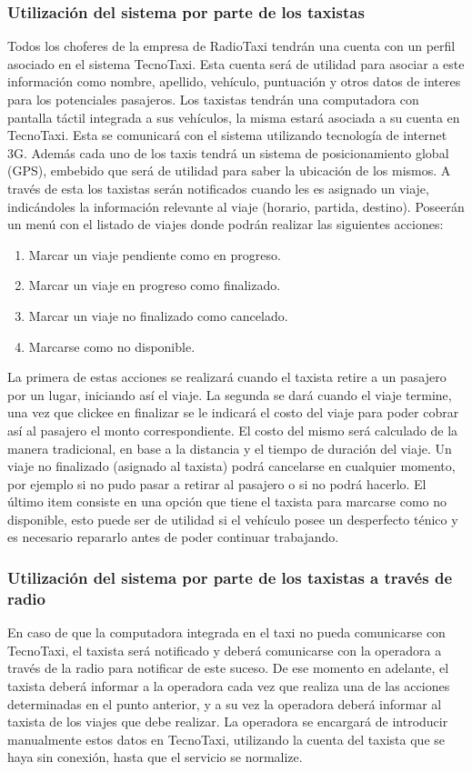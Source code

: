 	\subsubsection{Utilización del sistema por parte de los taxistas}
	\label{section:utilizaciontaxista}
	Todos los choferes de la empresa de RadioTaxi tendrán una cuenta con un perfil asociado en el sistema TecnoTaxi. Esta cuenta será de utilidad para asociar a este información como nombre, apellido, vehículo, puntuación y otros datos de interes para los potenciales pasajeros. Los taxistas tendrán una computadora con pantalla táctil integrada a sus vehículos, la misma estará asociada a su cuenta en TecnoTaxi. Esta se comunicará con el sistema utilizando tecnología de internet 3G. Además cada uno de los taxis tendrá un sistema de posicionamiento global (GPS), embebido que será de utilidad para saber la ubicación de los mismos. A través de esta los taxistas serán notificados cuando les es asignado un viaje, indicándoles la información relevante al viaje (horario, partida, destino). Poseerán un menú con el listado de viajes donde podrán realizar las siguientes acciones:
	\begin{enumerate}
	\item Marcar un viaje pendiente como en progreso.
	\item Marcar un viaje en progreso como finalizado.
	\item Marcar un viaje no finalizado como cancelado.
	\item Marcarse como no disponible.
	\end{enumerate}
	La primera de estas acciones se realizará cuando el taxista retire a un pasajero por un lugar, iniciando así el viaje. La segunda se dará cuando el viaje termine, una vez que clickee en finalizar se le indicará el costo del viaje para poder cobrar así al pasajero el monto correspondiente. El costo del mismo será calculado de la manera tradicional, en base a la distancia y el tiempo de duración del viaje. Un viaje no finalizado (asignado al taxista) podrá cancelarse en cualquier momento, por ejemplo si no pudo pasar a retirar al pasajero o si no podrá hacerlo. El último item consiste en una opción que tiene el taxista para marcarse como no disponible, esto puede ser de utilidad si el vehículo posee un desperfecto ténico y es necesario repararlo antes de poder continuar trabajando.

	\subsubsection{Utilización del sistema por parte de los taxistas a través de radio}
	En caso de que la computadora integrada en el taxi no pueda comunicarse con TecnoTaxi, el taxista será notificado y deberá comunicarse con la operadora a través de la radio para notificar de este suceso. De ese momento en adelante, el taxista deberá informar a la operadora cada vez que realiza una de las acciones determinadas en el punto anterior, y a su vez la operadora deberá informar al taxista de los viajes que debe realizar. La operadora se encargará de introducir manualmente estos datos en TecnoTaxi, utilizando la cuenta del taxista que se haya sin conexión, hasta que el servicio se normalize.

